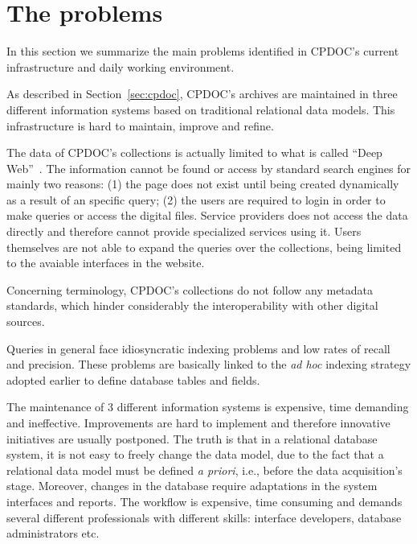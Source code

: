 
\section{The problems}\label{sec:problems}

In this section we summarize the main problems identified in CPDOC's
current infrastructure and daily working environment.

As described in Section~\ref{sec:cpdoc}, CPDOC's archives are
maintained in three different information systems based on traditional
relational data models. This infrastructure is hard to maintain,
improve and refine. 


The data of CPDOC's collections  is
actually limited to what is called ``Deep
Web''~\cite{bergman2001white}. The information cannot be found or
access by standard search engines for mainly two reasons: (1) the page
does not exist until being created dynamically as a result of an
specific query; (2) the users are required to login in order to make
queries or access the digital files. Service providers does not access
the data directly and therefore cannot provide specialized services
using it. Users themselves are not able to expand the queries
over the collections, being limited to the avaiable interfaces in the website.

Concerning terminology, CPDOC's collections do not follow any metadata
standards, which hinder considerably the interoperability with other
digital sources.

Queries in general face idiosyncratic indexing
problems and low rates of recall and precision. These problems are
basically linked to the \emph{ad hoc} indexing strategy adopted
earlier to define database tables and fields.

The maintenance of 3 different information systems is expensive, time
demanding and ineffective. Improvements are hard to implement and
therefore innovative initiatives are usually postponed.
The truth is that in a relational database system, it is not easy to
freely change the data model, due to the
fact that a relational data model must be defined \emph{a
  priori}, i.e., before the  data acquisition's stage. Moreover,
changes in the database require adaptations in
the system interfaces and reports. The workflow is expensive, time
consuming and demands several different professionals with different
skills: interface developers, database administrators etc.

